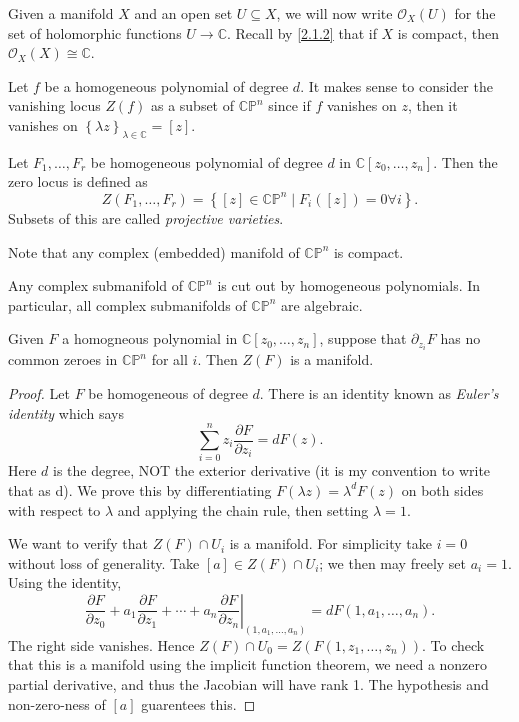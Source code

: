 
\begin{notation}
	Given a manifold $X$ and an open set $U\subseteq X$, we will now write $\mathcal{O} _X(U)$ for the set of holomorphic functions $U\to \mathbb{C} $. Recall by \cref{2.1.2} that if $X$ is compact, then $\mathcal{O} _X(X)\cong \mathbb{C} $.
\end{notation}

Let $f$ be a homogeneous polynomial of degree $d$. It makes sense to consider the vanishing locus $Z(f)$ as a subset of $\mathbb{C} \mathbb{P} ^n$ since if $f$ vanishes on $z$, then it vanishes on $\left\{ \lambda z \right\}_{\lambda \in\mathbb{C} } =[z]$.

\begin{definition}\label{???}
	Let $F_1, \ldots ,F_r$ be homogeneous polynomial of degree $d$ in $\mathbb{C} [z_0, \ldots ,z_n]$. Then the zero locus is defined as
	\[
		Z(F_1, \ldots ,F_r)=\left\{ [z]\in\mathbb{C} \mathbb{P} ^n\mid F_i([z])=0\forall i \right\} 
	.\]
	Subsets of this are called \emph{projective varieties}.
\end{definition}

Note that any complex (embedded) manifold of $\mathbb{C} \mathbb{P} ^n$ is compact.

\begin{theorem}[Chow]\label{???????}
	Any complex submanifold of $\mathbb{C} \mathbb{P} ^n$ is cut out by homogeneous polynomials. In particular, all complex submanifolds of $\mathbb{C} \mathbb{P} ^n$ are algebraic.
\end{theorem}

\begin{proposition}\label{??a;lkdmsjk}
	Given $F$ a homogneous polynomial in $\mathbb{C} [z_0, \ldots ,z_n]$, suppose that $\partial_{z_i} F$ has no common zeroes in $\mathbb{C} \mathbb{P} ^n$ for all $i$. Then $Z(F)$ is a manifold.
\end{proposition}
\begin{proof}
	Let $F$ be homogeneous of degree $d$. There is an identity known as \emph{Euler's identity} which says
	\[
		\sum_{i=0}^{n} z_i \frac{\partial F}{\partial z_i} =dF(z)
	.\]
	Here $d$ is the degree, NOT the exterior derivative (it is my convention to write that as d). We prove this by differentiating $F(\lambda z)=\lambda ^dF(z)$ on both sides with respect to $\lambda $ and applying the chain rule, then setting $\lambda =1$.

	We want to verify that $Z(F) \cap U_i$ is a manifold. For simplicity take $i=0$ without loss of generality. Take $[a]\in Z(F) \cap U_i$; we then may freely set $a_i=1$. Using the identity,
	\[
		\left.\frac{\partial F}{\partial z_0} +a_1 \frac{\partial F}{\partial z_1} +\cdots +a_n\frac{\partial F}{\partial z_n}\right|_{(1,a_1, \ldots ,a_n)}  =dF(1,a_1, \ldots ,a_n)
	.\]
	The right side vanishes. Hence $Z(F) \cap U_0 = Z(F(1,z_1, \ldots ,z_n))$. To check that this is a manifold using the implicit function theorem, we need a nonzero partial derivative, and thus the Jacobian will have rank 1. The hypothesis and non-zero-ness of $[a]$ guarentees this.
\end{proof}


